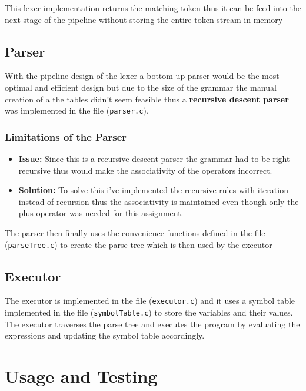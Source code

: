 \documentclass[12pt,a4paper]{article}
\begin{document}
This lexer implementation returns the matching token thus it can be feed into the next stage of the pipeline without storing the entire token stream in memory

\subsection{Parser}

With the pipeline design of the lexer a bottom up parser would be the most optimal and efficient design but due to the size of the grammar the manual creation of a the tables didn't seem feasible thus a \textbf{recursive descent parser} was implemented in the file (\texttt{parser.c}).

\subsubsection{Limitations of the Parser}
\begin{itemize}
    \item \textbf{Issue:} Since this is a recursive descent parser the grammar had to be right recursive thus would make the associativity of the operators incorrect.

    \item \textbf{Solution:} To solve this i've implemented the recursive rules with iteration instead of recursion thus the associativity is maintained even though only the plus operator was needed for this assignment.

\end{itemize}

The parser then finally uses the convenience functions defined in the file (\texttt{parseTree.c}) to create the parse tree which is then used by the executor

\subsection{Executor}

The executor is implemented in the file (\texttt{executor.c}) and it uses a symbol table implemented in the file (\texttt{symbolTable.c}) to store the variables and their values. The executor traverses the parse tree and executes the program by evaluating the expressions and updating the symbol table accordingly.

\section{Usage and Testing}
\end{document}
